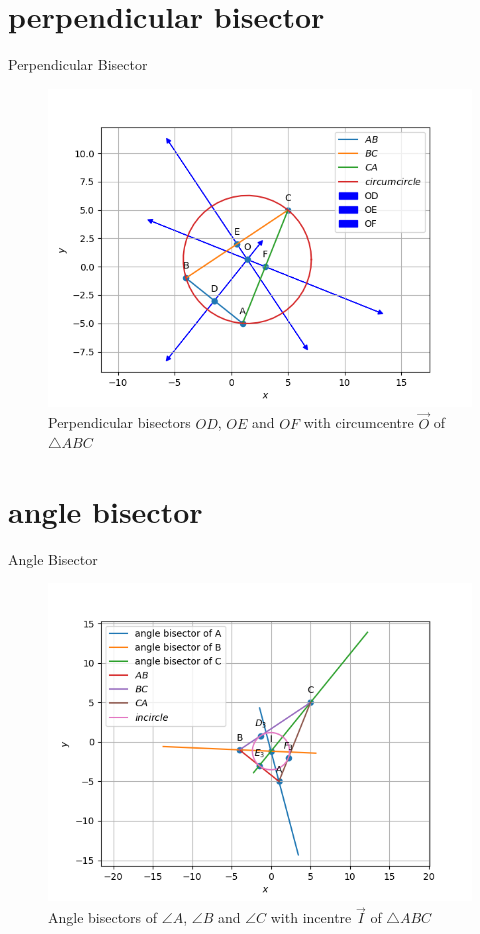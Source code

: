 \documentclass[journal,12pt,onecolumn]{IEEEtran}
\theoremstyle{remark}
\begin{document}
\begin{table}[!ht]
	\section{perpendicular bisector}
	\centering
	
	\caption{Perpendicular Bisector}
	\label{table:Perpendicular Bisector}
\end{table}

\begin{figure}
\includegraphics[width=\columnwidth]{./figs/Q1.4.1.png}
\caption{Perpendicular bisectors $OD$, $OE$ and $OF$ with circumcentre $\vec{O}$ of $\triangle ABC$}
\label{fig:perpendicular bisector}
\end{figure}

\begin{table}[!ht]
	\section{angle bisector}
	\centering
	
	\caption{Angle Bisector}
	\label{table:Angle Bisector}
\end{table}

\begin{figure}
\includegraphics[width=\columnwidth]{./figs/Q1.5.1.png}
\caption{Angle bisectors of $\angle A$, $\angle B$ and $\angle C$ with incentre $\vec{I}$ of $\triangle ABC$}
\label{fig:angle bisector}
\end{figure}
\end{document}
